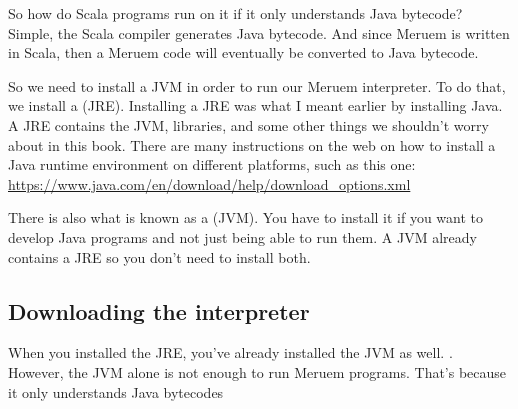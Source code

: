 So how do Scala programs run on it if it only understands Java bytecode? Simple, the Scala compiler generates Java bytecode. And since Meruem is written in Scala, then a Meruem code will eventually be converted to Java bytecode. 

So we need to install a JVM in order to run our Meruem interpreter. To do that, we install a (JRE). Installing a JRE was what I meant earlier by installing Java. A JRE contains the JVM, libraries, and some other things we shouldn't worry about in this book. There are many instructions on the web on how to install a Java runtime environment on different platforms, such as this one: \url{ https://www.java.com/en/download/help/download_options.xml}

\begin{noteparagraph}
	There is also what is known as a (JVM). You have to 	 
	install it if you want to develop Java programs and not just being able to run them. A JVM 
	already contains a JRE so you don't need to install both.
\end{noteparagraph}

\subsection{Downloading the interpreter}
When you installed the JRE, you've already installed the JVM as well. . However, the JVM alone is not enough to run Meruem programs. That's because it only understands Java bytecodes

